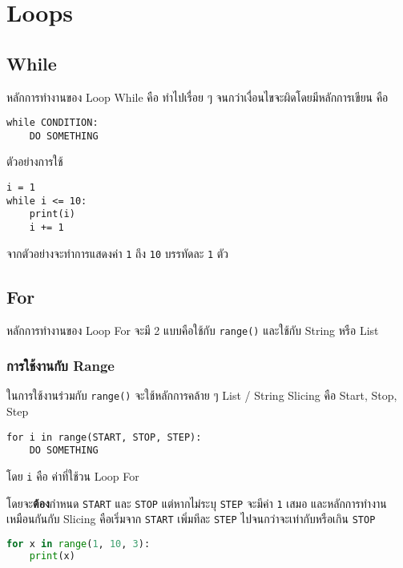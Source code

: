 \section{Loops}

\subsection{While}

หลักการทำงานของ Loop While คือ ทำไปเรื่อย ๆ จนกว่าเงื่อนไขจะผิดโดยมีหลักการเขียน คือ

\begin{verbatim}
while CONDITION:
    DO SOMETHING
\end{verbatim}

ตัวอย่างการใช้

\begin{lstlisting}
i = 1
while i <= 10:
    print(i)
    i += 1
\end{lstlisting}

จากตัวอย่างจะทำการแสดงค่า \verb|1| ถึง \verb|10| บรรทัดละ \verb|1| ตัว

\subsection{For}

หลักการทำงานของ Loop For จะมี 2 แบบคือใช้กับ \verb|range()| และใช้กับ String หรือ List

\subsubsection{การใช้งานกับ Range}


ในการใช้งานร่วมกับ \verb|range()| จะใช้หลักการคล้าย ๆ List / String Slicing คือ Start, Stop, Step

\begin{verbatim}
for i in range(START, STOP, STEP):
    DO SOMETHING
\end{verbatim}

โดย \verb|i| คือ ค่าที่ใช้วน Loop For

โดยจะ\textbf{ต้อง}กำหนด \verb|START| และ \verb|STOP| แต่หากไม่ระบุ \verb|STEP| จะมีค่า \verb|1| เสมอ และหลักการทำงานเหมือนกันกับ Slicing คือเริ่มจาก \verb|START| เพิ่มทีละ \verb|STEP| ไปจนกว่าจะเท่ากับหรือเกิน \verb|STOP|

\begin{lstlisting}[language=Python]
for x in range(1, 10, 3):
    print(x)
\end{lstlisting}

